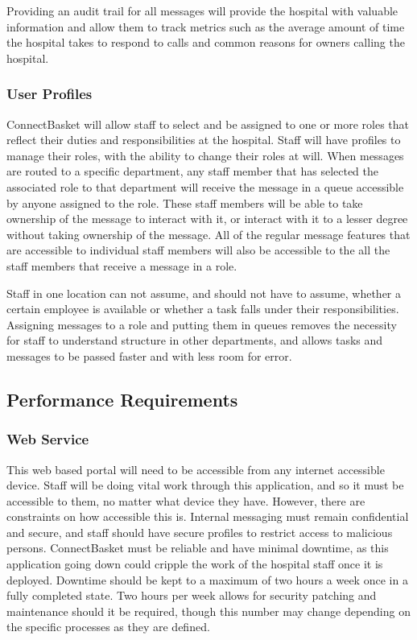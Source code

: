\documentclass[onecolumn, draftclsnofoot,10pt, compsoc]{IEEEtran}
\begin{document}
Providing an audit trail for all messages will provide the hospital with valuable information and allow them to track metrics such as the average amount of time the hospital takes to respond to calls and common reasons for owners calling the hospital. 

\subsubsection{User Profiles}
ConnectBasket will allow staff to select and be assigned to one or more roles that reflect their duties and responsibilities at the hospital. Staff will have profiles to manage their roles, with the ability to change their roles at will. When messages are routed to a specific department, any staff member that has selected the associated role to that department will receive the message in a queue accessible by anyone assigned to the role. These staff members will be able to take ownership of the message to interact with it, or interact with it to a lesser degree without taking ownership of the message. All of the regular message features that are accessible to individual staff members will also be accessible to the all the staff members that receive a message in a role. 

Staff in one location can not assume, and should not have to assume, whether a certain employee is available or whether a task falls under their responsibilities. Assigning messages to a role and putting them in queues removes the necessity for staff to understand structure in other departments, and allows tasks and messages to be passed faster and with less room for error.

\subsection{Performance Requirements}

\subsubsection{Web Service}
This web based portal will need to be accessible from any internet accessible device. Staff will be doing vital work through this application, and so it must be accessible to them, no matter what device they have. However, there are constraints on how accessible this is. Internal messaging must remain confidential and secure, and staff should have secure profiles to restrict access to malicious persons. ConnectBasket must be reliable and have minimal downtime, as this application going down could cripple the work of the hospital staff once it is deployed. Downtime should be kept to a maximum of two hours a week once in a fully completed state. Two hours per week allows for security patching and maintenance should it be required, though this number may change depending on the specific processes as they are defined.
\end{document}
